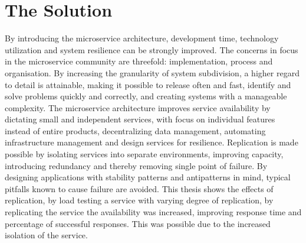 \section{The Solution}
By introducing the microservice architecture, development time, technology utilization and system resilience can be strongly improved. The concerns in focus in the microservice community are threefold: implementation, process and organisation. By increasing the granularity of system subdivision, a higher regard to detail is attainable, making it possible to release often and fast, identify and solve problems quickly and correctly, and creating systems with a manageable complexity. The microservice architecture improves service availability by dictating small and independent services, with focus on individual features instead of entire products, decentralizing data management, automating infrastructure management and design services for resilience. Replication is made possible by isolating services into separate environments, improving capacity, introducing redundancy and thereby removing single point of failure. By designing applications with stability patterns and antipatterns in mind, typical pitfalls known to cause failure are avoided. This thesis shows the effects of replication, by load testing a service with varying degree of replication, by replicating the service the availability was increased, improving response time and percentage of successful responses. This was possible due to the increased isolation of the service.

